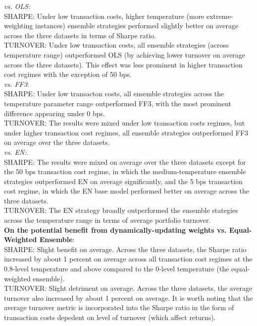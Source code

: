 \documentclass{article}
\begin{document}
\emph{vs. OLS:}\\
SHARPE: Under low transaction costs, higher temperature (more extreme-weighting instances) ensemble strategies performed slightly better on average across the three datasets in terms of Sharpe ratio. \\
TURNOVER: Under low transaction costs, all ensemble strategies (across temperature range) outperformed OLS (by achieving lower turnover on average across the three datasets). This effect was less prominent in higher transaction cost regimes with the exception of 50 bps.\\
\emph{vs. FF3}:\\
SHARPE: Under low transacton costs, all ensemble strategies across the temperature parameter range outperformed FF3, with the most prominent difference appearing under 0 bps.\\
TURNOVER: The results were mixed under low transaction costs regimes, but under higher transaction cost regimes, all ensemble strategies outperformed FF3 on average over the three datasets.\\
\emph{vs. EN:}.\\
SHARPE: The results were mixed on average over the three datasets except for the 50 bps transaction cost regime, in which the medium-temperature ensemble strategies outperformed EN on average significantly, and the 5 bps transaction cost regime, in which the EN base model performed better on average across the three datasets.\\
TURNOVER: The EN strategy broadly outperformed the ensemble stategies across the temperature range in terms of average portfolio turnover.\\

\textbf{On the potential benefit from dynamically-updating weights vs. Equal-Weighted Ensemble}:\\
SHARPE: Slight benefit on average. Across the three datasets, the Sharpe ratio increased by about 1 percent on average across all transaction cost regimes at the 0.8-level temperature and above compared to the 0-level temperature (the equal-weighted ensemble).\\

TURNOVER: Slight detriment on average. Across the three datasets, the average turnover also increased by about 1 percent on average. It is worth noting that the average turnover metric is incorporated into the Sharpe ratio in the form of transaction costs depedent on level of turnover (which affect returns).\\
\end{document}
